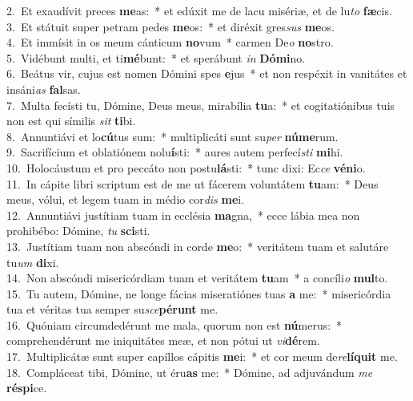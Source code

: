 {2.~}Et exaudívit preces \textbf{me}as:~* et edúxit me de lacu misériæ, et de lu\textit{to} \textbf{fæ}cis.\\
{3.~}Et státuit super petram pedes \textbf{me}os:~* et diréxit gres\textit{sus} \textbf{me}os.\\
{4.~}Et immísit in os meum cánticum \textbf{no}vum~* carmen De\textit{o} \textbf{no}stro.\\
{5.~}Vidébunt multi, et ti\textbf{mé}bunt:~* et sperábunt \textit{in} \textbf{Dó}\textbf{mi}no.\\
{6.~}Beátus vir, cujus est nomen Dómini spes \textbf{e}jus~* et non respéxit in vanitátes et insáni\textit{as} \textbf{fal}sas.\\
{7.~}Multa fecísti tu, Dómine, Deus meus, mirabília \textbf{tu}a:~* et cogitatiónibus tuis non est qui símilis \textit{sit} \textbf{ti}bi.\\
{8.~}Annuntiávi et lo\textbf{cú}tus sum:~* multiplicáti sunt su\textit{per} \textbf{nú}\textbf{me}rum.\\
{9.~}Sacrifícium et oblatiónem nolu\textbf{í}sti:~* aures autem perfecí\textit{sti} \textbf{mi}hi.\\
{10.~}Holocáustum et pro peccáto non postu\textbf{lá}sti:~* tunc dixi: Ec\textit{ce} \textbf{vé}\textbf{ni}o.\\
{11.~}In cápite libri scriptum est de me ut fácerem voluntátem \textbf{tu}am:~* Deus meus, vólui, et legem tuam in médio cor\textit{dis} \textbf{me}i.\\
{12.~}Annuntiávi justítiam tuam in ecclésia \textbf{ma}gna,~* ecce lábia mea non prohibébo: Dómine, \textit{tu} \textbf{sci}sti.\\
{13.~}Justítiam tuam non abscóndi in corde \textbf{me}o:~* veritátem tuam et salutáre tu\textit{um} \textbf{di}xi.\\
{14.~}Non abscóndi misericórdiam tuam et veritátem \textbf{tu}am~* a concíli\textit{o} \textbf{mul}to.\\
{15.~}Tu autem, Dómine, ne longe fácias miseratiónes tuas \textbf{a} me:~* misericórdia tua et véritas tua semper su\textit{sce}\textbf{pé}\textbf{runt} me.\\
{16.~}Quóniam circumdedérunt me mala, quorum non est \textbf{nú}merus:~* comprehendérunt me iniquitátes meæ, et non pótui ut \textit{vi}\textbf{dé}rem.\\
{17.~}Multiplicátæ sunt super capíllos cápitis \textbf{me}i:~* et cor meum de\textit{re}\textbf{lí}\textbf{quit} me.\\
{18.~}Compláceat tibi, Dómine, ut éru\textbf{as} me:~* Dómine, ad adjuvándum \textit{me} \textbf{ré}\textbf{spi}ce.\\
